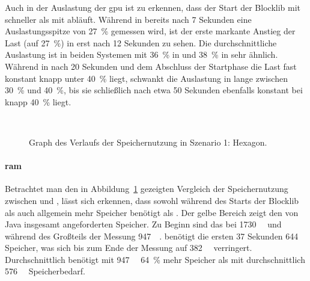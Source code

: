 Auch in der Auslastung der \ac{gpu} ist zu erkennen, dass der Start der Blocklib mit \sysA{} schneller als mit \sysB{} abläuft. Während in \sysA{} bereits nach 7 Sekunden eine Auslastungsspitze von \SI{27}{\percent} gemessen wird, ist der erste markante Anstieg der Last (auf \SI{27}{\percent}) in \sysB{}  erst nach 12 Sekunden zu sehen. Die durchschnittliche Auslastung ist in beiden Systemen mit \SI{36}{\percent} in \sysA{} und \SI{38}{\percent} in \sysB{} sehr ähnlich. Während in \sysB{} nach 20 Sekunden und dem Abschluss der Startphase die Last fast konstant knapp unter \SI{40}{\percent} liegt, schwankt die Auslastung in \sysA{} lange zwischen \SI{30}{\percent} und \SI{40}{\percent}, bis sie schließlich nach etwa 50 Sekunden ebenfalls konstant bei knapp \SI{40}{\percent} liegt.

\begin{figure}[!htbp]
	\\
	\caption{Graph des Verlaufs der Speichernutzung in Szenario 1: Hexagon.}\label{fig:seed-0-hexagon-mem}
\end{figure} 
\paragraph{\ac{ram}} Betrachtet man den in Abbildung~\ref{fig:seed-0-hexagon-mem} gezeigten Vergleich der Speichernutzung zwischen \sysA{} und \sysB{}, lässt sich erkennen, dass \sysB{} sowohl während des Starts der Blocklib als auch allgemein mehr Speicher benötigt als \sysA{}. Der gelbe Bereich zeigt den von Java insgesamt angeforderten Speicher. Zu Beginn sind das bei \sysB{} \SI{1730}{\mega\byte} und während des Großteils der Messung \SI{947}{\mega\byte}. \sysA{} benötigt die ersten 37 Sekunden \SI{644}{\mega\byte} Speicher, was sich bis zum Ende der Messung auf \SI{382}{\mega\byte} verringert. Durchschnittlich benötigt \sysB{} mit \SI{947}{\mega\byte} \SI{64}{\percent} mehr Speicher als \sysA{} mit durchschnittlich \SI{576}{\mega\byte} Speicherbedarf.

